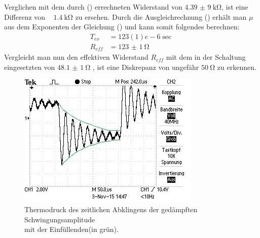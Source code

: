 Verglichen mit dem durch () errechneten Widerstand von $\SI{4,39(9)}{\kilo\ohm}$, ist eine Differenz von ~ $\SI{1,4}{\kilo\ohm}$ zu ersehen.
Durch die Ausgleichrechnung () erhält man $\mu$ aus dem Exponenten der Gleichung () und kann somit folgendes berechnen:
\begin{align*}
 T_{ex} &= \si{123(1)e-6}{\sec}\\
 R_{eff} &= \SI{123(1)}{\ohm}
\end{align*}
Vergleicht man nun den effektiven Widerstand $R_{eff}$ mit dem in der Schaltung eingesetzten von $\SI{48,1(1)}{\ohm}$ , ist eine Diskrepanz von ungefähr $\SI{50}{\ohm}$ zu erkennen.
\begin{figure}
\centering
\includegraphics{Thermo.jpg}
\caption{Thermodruck des zeitlichen Abklingens der gedämpften Schwingungsamplitude\\ mit der Einfüllenden(in grün).}
\label{fig:thermodruck}
\end{figure}
\newpage
